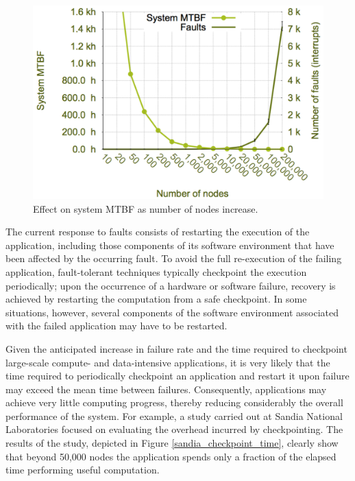 \begin{figure}[!t]
\begin{center}
	\includegraphics[width=\columnwidth]{figures/sandia_system_failure_rate_increase_nodes.pdf}
	\caption { Effect on system MTBF as number of nodes increase. }
	\label{fig:sandia_system_mtbf}
\end{center}
\end{figure}

The current response to faults consists of restarting the execution of
the application, including those components of its software
environment that have been affected by the occurring fault. To avoid
the full re-execution of the failing application, fault-tolerant
techniques typically checkpoint the execution periodically; upon the
occurrence of a hardware or software failure, recovery is achieved by
restarting the computation from a safe checkpoint. In some situations,
however, several components of the software environment associated
with the failed application may have to be restarted.

Given the anticipated increase in failure rate and the time required
to checkpoint large-scale compute- and data-intensive applications, it
is very likely that the time required to periodically checkpoint an
application and restart it upon failure may exceed the mean time
between failures.  Consequently, applications may achieve very little
computing progress, thereby reducing considerably the overall
performance of the system.  For example, a study carried out at Sandia
National Laboratories focused on evaluating the overhead incurred by
checkpointing. The results of the
study, depicted in Figure \ref{sandia_checkpoint_time}, clearly show
that beyond 50,000 nodes the application spends only a fraction of the
elapsed time performing useful computation.

